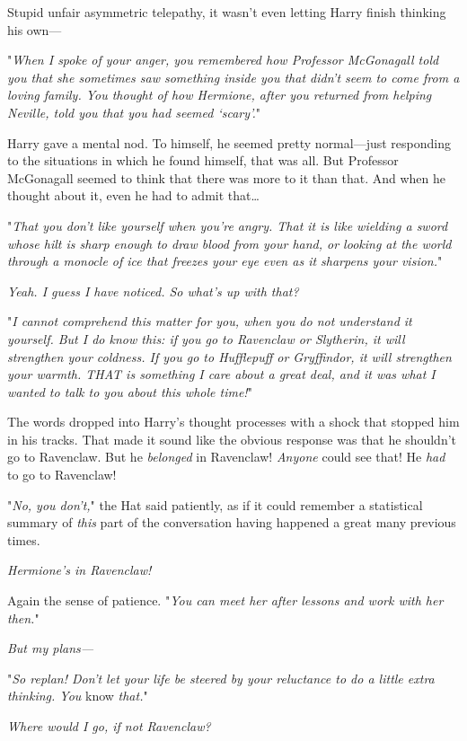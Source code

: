 Stupid unfair asymmetric telepathy, it wasn't even letting Harry finish
thinking his own---

"\emph{When I spoke of your anger, you remembered how Professor McGonagall told
you that she sometimes saw something inside you that didn't seem to come from a
loving family. You thought of how Hermione, after you returned from helping
Neville, told you that you had seemed `scary'.}"

Harry gave a mental nod. To himself, he seemed pretty normal---just responding
to the situations in which he found himself, that was all. But Professor
McGonagall seemed to think that there was more to it than that. And when he
thought about it, even he had to admit that{\ldots}

"\emph{That you don't like yourself when you're angry. That it is like wielding
a sword whose hilt is sharp enough to draw blood from your hand, or looking at
the world through a monocle of ice that freezes your eye even as it sharpens
your vision.}"

\emph{Yeah. I guess I have noticed. So what's up with that?}

"\emph{I cannot comprehend this matter for you, when you do not understand it
yourself. But I do know this: if you go to Ravenclaw or Slytherin, it will
strengthen your coldness. If you go to Hufflepuff or Gryffindor, it will
strengthen your warmth. THAT is something I care about a great deal, and it was
what I wanted to talk to you about this whole time!}"

The words dropped into Harry's thought processes with a shock that stopped him
in his tracks. That made it sound like the obvious response was that he
shouldn't go to Ravenclaw. But he \emph{belonged} in Ravenclaw! \emph{Anyone}
could see that! He \emph{had} to go to Ravenclaw!

"\emph{No, you don't,}" the Hat said patiently, as if it could remember a
statistical summary of \emph{this} part of the conversation having happened a
great many previous times.

\emph{Hermione's in Ravenclaw!}

Again the sense of patience. "\emph{You can meet her after lessons and work
with her then.}"

\emph{But my plans---}

"\emph{So replan! Don't let your life be steered by your reluctance to do a
little extra thinking. You} know \emph{that.}"

\emph{Where would I go, if not Ravenclaw?}

